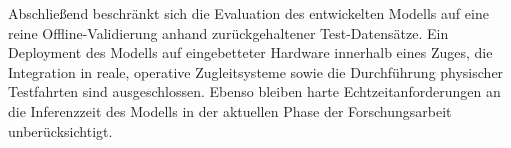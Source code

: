 Abschließend beschränkt sich die Evaluation des entwickelten Modells auf eine reine Offline-Validierung anhand zurückgehaltener Test-Datensätze. 
Ein Deployment des Modells auf eingebetteter Hardware innerhalb eines Zuges, die Integration in reale, operative Zugleitsysteme sowie die Durchführung physischer Testfahrten sind ausgeschlossen. 
Ebenso bleiben harte Echtzeitanforderungen an die Inferenzzeit des Modells in der aktuellen Phase der Forschungsarbeit unberücksichtigt.
